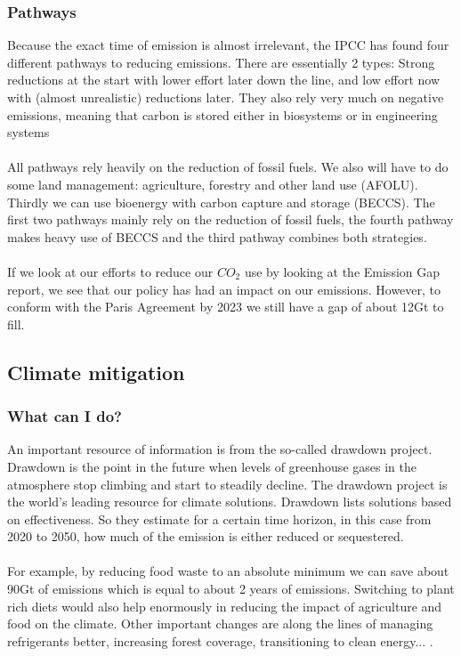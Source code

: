 \documentclass[../summary.tex]{subfiles}
\begin{document}
			\subsubsection{Pathways}
				Because the exact time of emission is almost irrelevant, the IPCC has found four different pathways to reducing emissions. There are essentially 2 types: Strong reductions at the start with lower effort later down the line, and low effort now with (almost unrealistic) reductions later. They also rely very much on negative emissions, meaning that carbon is stored either in biosystems or in engineering systems\\
				\\
				All pathways rely heavily on the reduction of fossil fuels. We also will have to do some land management: agriculture, forestry and other land use (AFOLU). Thirdly we can use bioenergy with carbon capture and storage (BECCS). The first two pathways mainly rely on the reduction of fossil fuels, the fourth pathway makes heavy use of BECCS and the third pathway combines both strategies. \\
				\\
				If we look at our efforts to reduce our $CO_2$ use by looking at the Emission Gap report, we see that our policy has had an impact on our emissions. However, to conform with the Paris Agreement by 2023 we still have a gap of about 12Gt to fill. %
		
		\subsection{Climate mitigation}
			\subsubsection{What can I do?}
				An important resource of information is from the so-called drawdown project. Drawdown is the point in the future when levels of greenhouse gases in the atmosphere stop climbing and start to steadily decline. The drawdown project is the world's leading resource for climate solutions. Drawdown lists solutions based on effectiveness. So they estimate for a certain time horizon, in this case from 2020 to 2050, how much of the emission is either reduced or sequestered. \\
				\\
				For example, by reducing food waste to an absolute minimum we can save about 90Gt of emissions which is equal to about 2 years of emissions. Switching to plant rich diets would also help enormously in reducing the impact of agriculture and food on the climate. Other important changes are along the lines of managing refrigerants better, increasing forest coverage, transitioning to clean energy... .
				
\end{document}
